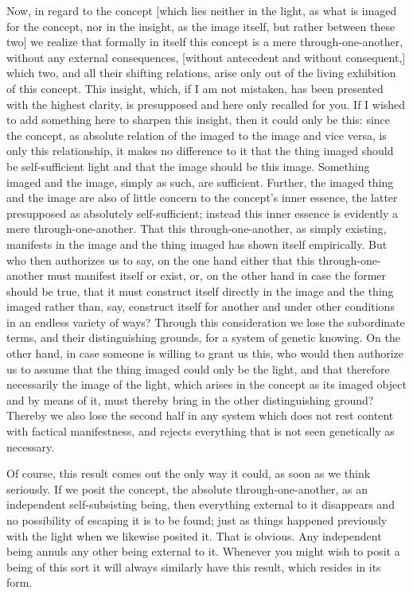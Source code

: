 Now, in regard to the concept
[which lies neither in the light,
as what is imaged for the concept,
nor in the insight, as the image itself,
but rather between these two]
we realize that formally in itself
this concept is a mere through-one-another,
without any external consequences,
[without antecedent and without consequent,]
which two, and all their shifting relations,
arise only out of the living exhibition of this concept.
This insight, which, if I am not mistaken,
has been presented with the highest clarity,
is presupposed and here only recalled for you.
If I wished to add something here
to sharpen this insight,
then it could only be this:
since the concept, as absolute relation of
the imaged to the image and vice versa,
is only this relationship,
it makes no difference to it that
the thing imaged should be self-sufficient light
and that the image should be this image.
Something imaged and the image,
simply as such, are sufficient.
Further, the imaged thing and the image are
also of little concern to the concept's inner essence,
the latter presupposed as absolutely self-sufficient;
instead this inner essence is
evidently a mere through-one-another.
That this through-one-another, as simply existing,
manifests in the image and the thing imaged
has shown itself empirically.
But who then authorizes us to say,
on the one hand either that this
through-one-another must manifest itself or exist,
or, on the other hand in case the former should be true,
that it must construct itself directly
in the image and the thing imaged
rather than, say, construct itself
for another and under other conditions
in an endless variety of ways?
Through this consideration
we lose the subordinate terms,
and their distinguishing grounds,
for a system of genetic knowing.
On the other hand, in case someone is
willing to grant us this,
who would then authorize us
to assume that the thing imaged
could only be the light,
and that therefore necessarily
the image of the light,
which arises in the concept
as its imaged object and by means of it,
must thereby bring in the other distinguishing ground?
Thereby we also lose the second half in any system
which does not rest content with factical manifestness,
and rejects everything that is not
seen genetically as necessary.

Of course, this result comes out the only way it could,
as soon as we think seriously.
If we posit the concept, the absolute through-one-another,
as an independent self-subsisting being,
then everything external to it disappears
and no possibility of escaping it is to be found;
just as things happened previously
with the light when we likewise posited it.
That is obvious.
Any independent being annuls any other being external to it.
Whenever you might wish to posit a being of this sort
it will always similarly have this result,
which resides in its form.

